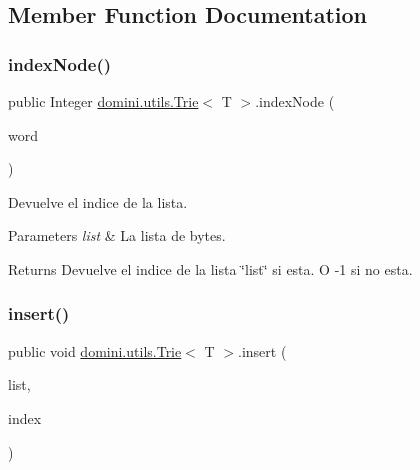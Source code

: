 \subsection{Member Function Documentation}
\mbox{\label{classdomini_1_1utils_1_1Trie_a5c30e36df9ab804bbc054805358ecf2a}} 
\subsubsection{\texorpdfstring{index\+Node()}{indexNode()}}
{\footnotesize\ttfamily public Integer \hyperlink{classdomini_1_1utils_1_1Trie}{domini.\+utils.\+Trie}$<$ T $>$.index\+Node (\begin{DoxyParamCaption}\item[{Array\+List$<$ T $>$}]{word }\end{DoxyParamCaption})\hspace{0.3cm}{\ttfamily [inline]}}



Devuelve el indice de la lista. 


\begin{DoxyParams}{Parameters}
{\em list} & La lista de bytes. \\
\hline
\end{DoxyParams}
\begin{DoxyReturn}{Returns}
Devuelve el indice de la lista \char`\"{}list\char`\"{} si esta. O -\/1 si no esta. 
\end{DoxyReturn}
\mbox{\label{classdomini_1_1utils_1_1Trie_a3599001d9b056f0b54ab7eabb9d3510b}} 
\subsubsection{\texorpdfstring{insert()}{insert()}}
{\footnotesize\ttfamily public void \hyperlink{classdomini_1_1utils_1_1Trie}{domini.\+utils.\+Trie}$<$ T $>$.insert (\begin{DoxyParamCaption}\item[{Array\+List$<$ T $>$}]{list,  }\item[{Integer}]{index }\end{DoxyParamCaption})\hspace{0.3cm}{\ttfamily [inline]}}



